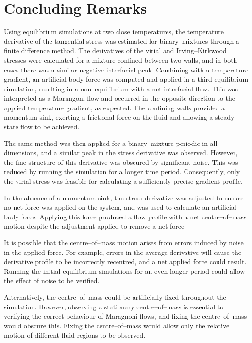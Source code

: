 \section{Concluding Remarks}
Using equilibrium simulations at two close temperatures, the temperature derivative of the tangential stress was estimated for binary--mixtures through a finite difference method.
The derivatives of the virial and Irving--Kirkwood stresses were calculated for a mixture confined between two walls, and in both cases there was a similar negative interfacial peak.
Combining with a temperature gradient, an artificial body force was computed and applied in a third equilibrium simulation, resulting in a non--equilibrium with a net interfacial flow.
This was interpreted as a Marangoni flow and occurred in the opposite direction to the applied temperature gradient, as expected.
The confining walls provided a momentum sink, exerting a frictional force on the fluid and allowing a steady state flow to be achieved.

The same method was then applied for a binary--mixture periodic in all dimensions, and a similar peak in the stress derivative was observed.
However, the fine structure of this derivative was obscured by significant noise.
This was reduced by running the simulation for a longer time period.
Consequently, only the virial stress was feasible for calculating a sufficiently precise gradient profile.

In the absence of a momentum sink, the stress derivative was adjusted to ensure no net force was applied on the system, and was used to calculate an artificial body force.
Applying this force produced a flow profile with a net centre--of--mass motion despite the adjustment applied to remove a net force.

It is possible that the centre--of--mass motion arises from errors induced by noise in the applied force.
For example, errors in the average derivative will cause the derivative profile to be incorrectly recentred, and a net applied force could result.
Running the initial equilibrium simulations for an even longer period could allow the effect of noise to be verified. 

Alternatively, the centre--of--mass could be artificially fixed throughout the simulation.
However, observing a stationary centre--of--mass is essential to verifying the correct behaviour of Maragnoni flows, and fixing the centre--of--mass would obscure this.
Fixing the centre--of--mass would allow only the relative motion of different fluid regions to be observed.

